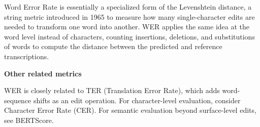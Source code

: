 {Word Error Rate is essentially a specialized form of the Levenshtein distance, a string metric introduced in 1965 to measure how many
single-character edits are needed to transform one word into another. WER applies the same idea at the word level instead of characters,
counting insertions, deletions, and substitutions of words to compute the distance between the predicted and reference transcriptions.}

\textbf{Other related metrics}

WER is closely related to TER (Translation Error Rate), which adds word-sequence shifts as an edit operation. For character-level evaluation,
consider Character Error Rate (CER). For semantic evaluation beyond surface-level edits, see BERTScore.
